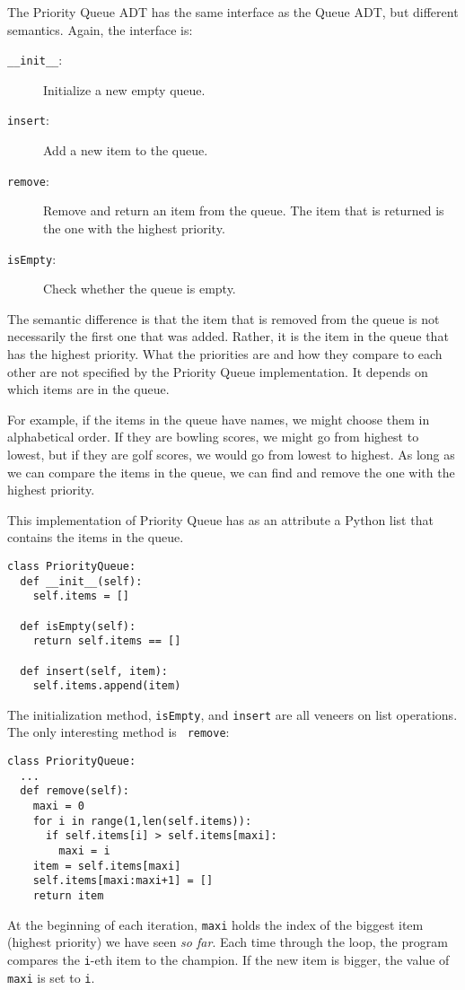The Priority Queue ADT has the same interface as the Queue ADT, but
different semantics.  Again, the interface is:

\begin{description}

\item[{\tt \_\_init\_\_}:] Initialize a new empty queue.

\item[{\tt insert}:] Add a new item to the queue.

\item[{\tt remove}:] Remove and return an item from the queue.  The item
that is returned is the one with the highest priority.

\item[{\tt isEmpty}:] Check whether the queue is empty.

\end{description}

The semantic difference is that the item that is removed from the
queue is not necessarily the first one that was added.  Rather, it is
the item in the queue that has the highest priority.  What the
priorities are and how they compare to each other are not specified by
the Priority Queue implementation.  It depends on which items are in
the queue.

For example, if the items in the queue have names, we might choose
them in alphabetical order.  If they are bowling scores, we might go
from highest to lowest, but if they are golf scores, we would go from
lowest to highest.  As long as we can compare the items in the queue,
we can find and remove the one with the highest priority.

This implementation of Priority Queue has as an attribute
a Python list that
contains the items in the queue.

\beforeverb
\begin{verbatim}
class PriorityQueue:
  def __init__(self):
    self.items = []

  def isEmpty(self):
    return self.items == []

  def insert(self, item):
    self.items.append(item)
\end{verbatim}
\afterverb
%
The initialization method, {\tt isEmpty}, and {\tt insert} are all
veneers on list operations.  The only interesting method is {\tt
remove}:

\beforeverb
\begin{verbatim}
class PriorityQueue:
  ...
  def remove(self):
    maxi = 0
    for i in range(1,len(self.items)):
      if self.items[i] > self.items[maxi]:
        maxi = i
    item = self.items[maxi]
    self.items[maxi:maxi+1] = []
    return item
\end{verbatim}
\afterverb
%
At the beginning of each iteration, {\tt maxi} holds the index of the
biggest item (highest priority) we have seen {\em so far}.  Each time
through the loop, the program compares the {\tt i}-eth item to the champion.
If the new item is bigger, the value of {\tt maxi} is set to {\tt i}.

